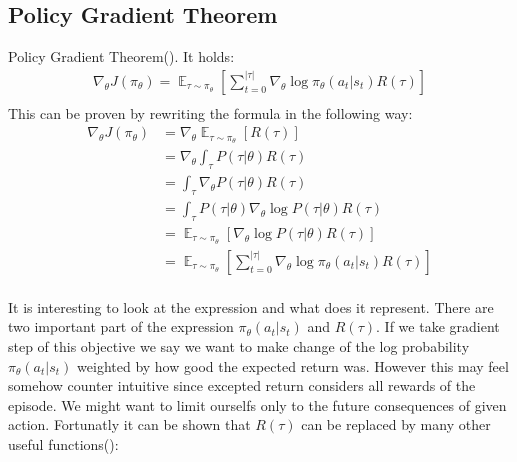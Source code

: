 \subsection{Policy Gradient Theorem}
Policy Gradient Theorem(\cite{sutton2018reinforcement}). It holds: 
\begin{align*}
  \nabla_\theta J(\pi_\theta) = \mathop{\mathbb{E}}_{\tau \sim \pi_\theta}[\sum_{t=0}^{|\tau|} \nabla_\theta \log \pi_\theta(a_t|s_t) R(\tau)] \\
\end{align*}
This can be proven by rewriting the formula in the following way:
\begin{align*}
  \nabla_\theta J(\pi_\theta) &= \nabla_\theta \mathop{\mathbb{E}}_{\tau \sim \pi_\theta}[R(\tau)] \\
  &= \nabla_\theta \int_{\tau}^{}P(\tau|\theta)R(\tau) \\
  &= \int_{\tau}^{} \nabla_\theta P(\tau|\theta)R(\tau) \\
  &= \int_{\tau}^{} P(\tau|\theta)\nabla_\theta \log P(\tau|\theta)R(\tau) \\
  &= \mathop{\mathbb{E}}_{\tau \sim \pi_\theta}[\nabla_\theta \log P(\tau|\theta)R(\tau)] \\
  &= \mathop{\mathbb{E}}_{\tau \sim \pi_\theta}[\sum_{t=0}^{|\tau|}  \nabla_\theta \log \pi_\theta(a_t|s_t) R(\tau)] \\
\end{align*}

It is interesting to look at the expression and what does it represent. 
There are two important part of the expression $\pi_\theta(a_t|s_t)$ and $R(\tau)$.
If we take gradient step of this objective we say we want to make change of the log probability $\pi_\theta(a_t|s_t)$ weighted by how good the expected return was.
However this may feel somehow counter intuitive since excepted return considers all rewards of the episode.
We might want to limit ourselfs only to the future consequences of given action.
Fortunatly it can be shown that $R(\tau)$ can be replaced by many other useful functions(\cite{GAE}):


